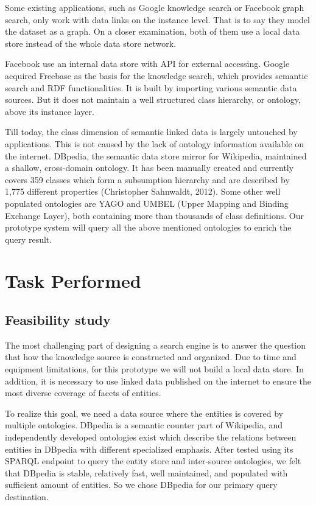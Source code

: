 \documentclass[12pt]{cls}
\begin{document}
Some existing applications, such as Google knowledge search or Facebook graph search, only work with data links on the instance level. That is to say they model the dataset as a graph. On a closer examination, both of them use a local data store instead of the whole data store network.

Facebook use an internal data store with API for external accessing. Google acquired Freebase as the basis for the knowledge search, which provides semantic search and RDF functionalities. It is built by importing various semantic data sources. But it does not maintain a well structured class hierarchy, or ontology, above its instance layer.

Till today, the class dimension of semantic linked data is largely untouched by applications. This is not caused by the lack of ontology information available on the internet. DBpedia, the semantic data store mirror for Wikipedia, maintained a shallow, cross-domain ontology. It has been manually created and currently covers 359 classes which form a subsumption hierarchy and are described by 1,775 different properties (Christopher Sahnwaldt, 2012). Some other well populated ontologies are YAGO and UMBEL (Upper Mapping and Binding Exchange Layer), both containing more than thousands of class definitions. Our prototype system will query all the above mentioned ontologies to enrich the query result.

\chapter{Task Performed}

\section{Feasibility study}

The most challenging part of designing a search engine is to answer the question that how the knowledge source is constructed and organized. Due to time and equipment limitations, for this prototype we will not build a local data store. In addition, it is necessary to use linked data published on the internet to ensure the most diverse coverage of facets of entities.

To realize this goal, we need a data source where the entities is covered by multiple ontologies. DBpedia is a semantic counter part of Wikipedia, and independently developed ontologies exist which describe the relations between entities in DBpedia with different specialized emphasis. After tested using its SPARQL endpoint to query the entity store and inter-source ontologies, we felt that DBpedia is stable, relatively fast, well maintained, and populated with sufficient amount of entities. So we chose DBpedia for our primary query destination.
\end{document}
